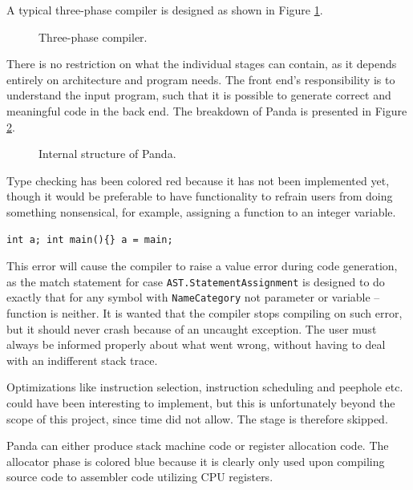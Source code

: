A typical three-phase compiler is designed as shown in Figure \ref{fig:three-phase}.

\begin{figure}[H]
    \centering
    
    \caption{Three-phase compiler.}
    \label{fig:three-phase}
\end{figure}

There is no restriction on what the individual stages can contain, as it depends entirely on architecture and program needs. The front end's responsibility is to understand the input program, such that it is possible to generate correct and meaningful code in the back end. The breakdown of Panda is presented in Figure \ref{fig:panda-structure}.

\begin{figure}[H]
    \centering
    
    \caption{Internal structure of Panda.}
    \label{fig:panda-structure}
\end{figure}

Type checking has been colored red because it has not been implemented yet, though it would be preferable to have functionality to refrain users from doing something nonsensical, for example, assigning a function to an integer variable.

\begin{verbatim}
int a; int main(){} a = main;
\end{verbatim}

This error will cause the compiler to raise a value error during code generation, as the match statement for case \texttt{AST.StatementAssignment} is designed to do exactly that for any symbol with \texttt{NameCategory} not parameter or variable -- function is neither. It is wanted that the compiler stops compiling on such error, but it should never crash because of an uncaught exception. The user must always be informed properly about what went wrong, without having to deal with an indifferent stack trace.

Optimizations like instruction selection, instruction scheduling and peephole etc. could have been interesting to implement, but this is unfortunately beyond the scope of this project, since time did not allow. The stage is therefore skipped.

Panda can either produce stack machine code or register allocation code. The allocator phase is colored blue because it is clearly only used upon compiling source code to assembler code utilizing CPU registers. 

